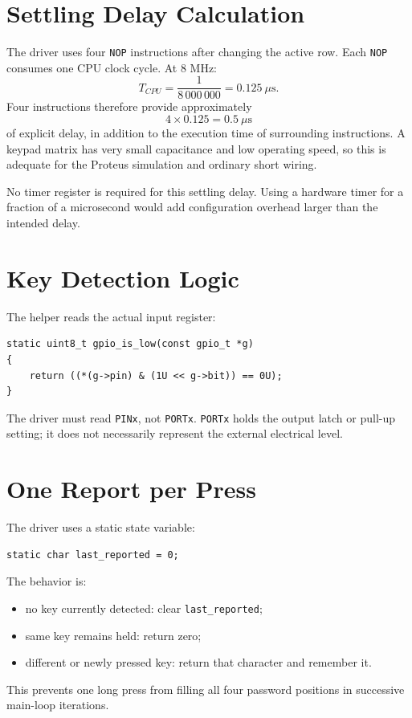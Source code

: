 \documentclass[11pt,a4paper]{article}
\begin{document}
\section{Settling Delay Calculation}
The driver uses four \texttt{NOP} instructions after changing the active row. Each \texttt{NOP} consumes one CPU clock cycle. At 8 MHz:
\[
T_{CPU}=\frac{1}{8\,000\,000}=0.125\ \mu\text{s}.
\]
Four instructions therefore provide approximately
\[
4\times0.125=0.5\ \mu\text{s}
\]
of explicit delay, in addition to the execution time of surrounding instructions. A keypad matrix has very small capacitance and low operating speed, so this is adequate for the Proteus simulation and ordinary short wiring.

No timer register is required for this settling delay. Using a hardware timer for a fraction of a microsecond would add configuration overhead larger than the intended delay.

\section{Key Detection Logic}
The helper reads the actual input register:
\begin{lstlisting}[style=cstyle]
static uint8_t gpio_is_low(const gpio_t *g)
{
    return ((*(g->pin) & (1U << g->bit)) == 0U);
}
\end{lstlisting}
The driver must read \texttt{PINx}, not \texttt{PORTx}. \texttt{PORTx} holds the output latch or pull-up setting; it does not necessarily represent the external electrical level.

\section{One Report per Press}
The driver uses a static state variable:
\begin{lstlisting}[style=cstyle]
static char last_reported = 0;
\end{lstlisting}
The behavior is:
\begin{itemize}
  \item no key currently detected: clear \texttt{last\_reported};
  \item same key remains held: return zero;
  \item different or newly pressed key: return that character and remember it.
\end{itemize}
This prevents one long press from filling all four password positions in successive main-loop iterations.
\end{document}
